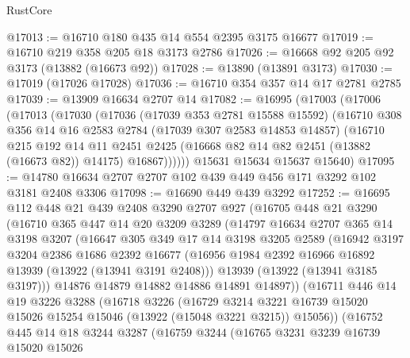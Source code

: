 \begin{lexlean}{RustCore}
\begin{coremodule}
@17013 := @16710 @180 @435 @14 @554 @2395 @3175 @16677
@17019 := @16710 @219 @358 @205 @18 @3173 @2786
@17026 := @16668 @92 @205 @92 @3173 (@13882 (@16673 @92))
@17028 := @13890 (@13891 @3173)
@17030 := @17019 (@17026 @17028)
@17036 := @16710 @354 @357 @14 @17 @2781 @2785
@17039 := @13909 @16634 @2707 @14
@17082 := @16995
    (@17003
      (@17006
        (@17013
          (@17030
            (@17036
              (@17039 @353 @2781 @15588 @15592)
              (@16710
                @308
                @356
                @14
                @16
                @2583
                @2784
                (@17039 @307 @2583 @14853 @14857)
                (@16710
                  @215
                  @192
                  @14
                  @11
                  @2451
                  @2425
                  (@16668 @82 @14 @82 @2451 (@13882 (@16673 @82)) @14175)
                  @16867))))))
      @15631
      @15634
      @15637
      @15640)
@17095 := @14780 @16634 @2707 @2707 @102 @439 @449 @456 @171 @3292 @102 @3181 @2408 @3306
@17098 := @16690 @449 @439 @3292
@17252 := @16695
    @112
    @448
    @21
    @439
    @2408
    @3290
    @2707
    @927
    (@16705
      @448
      @21
      @3290
      (@16710
        @365
        @447
        @14
        @20
        @3209
        @3289
        (@14797
          @16634
          @2707
          @365
          @14
          @3198
          @3207
          (@16647
            @305
            @349
            @17
            @14
            @3198
            @3205
            @2589
            (@16942
              @3197
              @3204
              @2386
              @1686
              @2392
              @16677
              (@16956 @1984 @2392 @16966 @16892 @13939 (@13922 (@13941 @3191 @2408)))
              @13939
              (@13922 (@13941 @3185 @3197)))
            @14876
            @14879
            @14882
            @14886
            @14891
            @14897))
        (@16711
          @446
          @14
          @19
          @3226
          @3288
          (@16718
            @3226
            (@16729
              @3214
              @3221
              @16739
              @15020
              @15026
              @15254
              @15046
              (@13922 (@15048 @3221 @3215))
              @15056))
          (@16752
            @445
            @14
            @18
            @3244
            @3287
            (@16759
              @3244
              (@16765
                @3231
                @3239
                @16739
                @15020
                @15026

\end{coremodule}
\end{lexlean}

